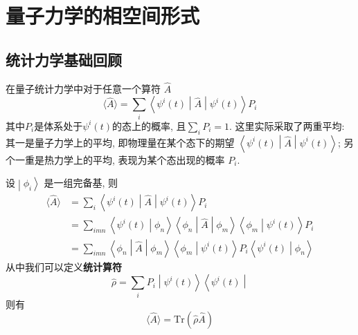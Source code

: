 \chapter{量子力学的相空间形式}
    \section{统计力学基础回顾}

        在量子统计力学中对于任意一个算符 $\hat{A}$
        \begin{equation}
            \langle {\hat{A}} \rangle = \sum_i \left\langle {\psi^{i}(t)} \middle| {\hat{A}} \middle| {\psi^{i}(t)} \right\rangle P_{i}
        \end{equation}
        其中$P_i$是体系处于$\psi^{i}(t)$的态上的概率, 且$\sum_i P_i = 1$. 
        这里实际采取了两重平均: 其一是量子力学上的平均, 即物理量在某个态下的期望
        $\left\langle {\psi^{i}(t)} \middle| {\hat{A}} \middle| {\psi^{i}(t)} \right\rangle$; 
        另个一重是热力学上的平均, 表现为某个态出现的概率 $P_{i}$. 

        设$\left. \middle| {\phi_{i}} \right\rangle$ 是一组完备基, 则
        \begin{equation}\begin{aligned}
            \langle {\hat{A}} \rangle
            &= \sum_i \left\langle {\psi^{i}(t)} \middle| {\hat{A}} \middle| {\psi^{i}(t)} \right\rangle P_{i}
            \\
            &= \sum_{imn} \left\langle {\psi^{i}(t)} \middle| {\phi_{n}} \right\rangle \left\langle {\phi_{n}} \middle| {\hat{A}} \middle| {\phi_{m}} \right\rangle \left\langle {\phi_{m}} \middle| {\psi^{i}(t)} \right\rangle P_{i}
            \\
            &= \sum_{imn} \left\langle {\phi_{n}} \middle| {\hat{A}} \middle| {\phi_{m}} \right\rangle 
            \left\langle {\phi_{m}} \middle| {\psi^{i}(t)} \right\rangle P_{i}
            \left\langle {\psi^{i}(t)} \middle| {\phi_{n}} \right\rangle
        \end{aligned}\end{equation}
        从中我们可以定义\textbf{统计算符}
        \begin{equation}
            \hat{\rho} = \sum_i P_{i} \left. \middle| {\psi^{i}(t)} \right\rangle \left\langle {\psi^{i}(t)} \middle| \right.
        \end{equation}
        则有
        \begin{equation}
            \langle {\hat{A}} \rangle = \mathrm{Tr}(\hat{\rho}\hat{A})
        \end{equation}

